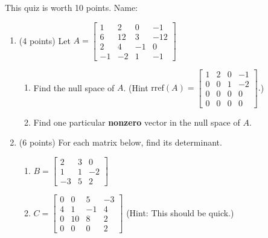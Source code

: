 \documentclass[11pt,fleqn]{article}
\newcommand{\bbm}{\begin{bmatrix}}
\newcommand{\ebm}{\end{bmatrix}}
\begin{document}
\renewcommand{\headrulewidth}{0pt}
\newcommand{\blank}[1]{\rule{#1}{0.75pt}}
\renewcommand{\d}{\displaystyle}
This quiz is worth 10 points. \hfill {\Large{Name: \underline{\hspace{2in}}}}
\begin{enumerate}
\item (4 points) Let $A=\bbm 1&2&0&-1\\
6&12&3&-12\\
2&4&-1&0\\
-1&-2&1&-1 \ebm$ \\
	\begin{enumerate}
	\item Find the null space of $A$. (Hint $\text{rref}(A)=\bbm 1&2&0&-1\\
	0&0&1&-2\\
	0&0&0&0\\
	0&0&0&0 \ebm.$)
	\vfill
	\item Find one particular \textbf{nonzero} vector in the null space of $A.$
	\vfill
	\end{enumerate}
\newpage
\item (6 points) For each matrix below, find its determinant.\\
	\begin{enumerate}
	\item $B=\bbm 2&3&0\\ 1&1&-2\\-3&5&2\ebm$
	\vfill
	\item $C=\bbm 0&0&5&-3\\4&1&-1&4\\0&10&8&2\\0&0&0&2 \ebm$ (Hint: This should be quick.)
	\vfill
	\end{enumerate}
\end{enumerate}
\end{document}
